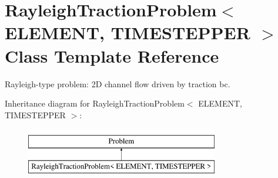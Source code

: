 \hypertarget{classRayleighTractionProblem}{}\section{Rayleigh\+Traction\+Problem$<$ E\+L\+E\+M\+E\+NT, T\+I\+M\+E\+S\+T\+E\+P\+P\+ER $>$ Class Template Reference}
\label{classRayleighTractionProblem}


Rayleigh-\/type problem\+: 2D channel flow driven by traction bc.  


Inheritance diagram for Rayleigh\+Traction\+Problem$<$ E\+L\+E\+M\+E\+NT, T\+I\+M\+E\+S\+T\+E\+P\+P\+ER $>$\+:\begin{figure}[H]
\begin{center}
\leavevmode
\includegraphics[height=2.000000cm]{classRayleighTractionProblem}
\end{center}
\end{figure}
